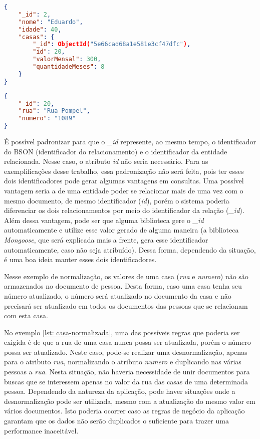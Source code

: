 \begin{lstlisting}[language=json, caption={Estrutura de Dados Normalizados da pessoa \textit{Eduardo}\label{lst: eduardo-normalizado}}]
{
    "_id": 2,
    "nome": "Eduardo",
    "idade": 40,
    "casas": {
        "_id": ObjectId("5e66cad68a1e581e3cf47dfc"),
        "id": 20,
        "valorMensal": 300,
        "quantidadeMeses": 8
    }
}
\end{lstlisting}

\begin{lstlisting}[language=json, caption={Estrutura de Dados Normalizados de uma casa\label{lst: casa-normalizada}}]
{
    "_id": 20,
    "rua": "Rua Pompel",
    "numero": "1089"
}
\end{lstlisting}

É possível padronizar para que o \textit{\_id} represente, ao mesmo tempo, o identificador do BSON (identificador do relacionamento) e o identificador da entidade relacionada. Nesse caso, o atributo \textit{id} não seria necessário. Para as exemplificações desse trabalho, essa padronização não será feita, pois ter esses dois identificadores pode gerar algumas vantagens em consultas. Uma possível vantagem seria a de uma entidade poder se relacionar mais de uma vez com o mesmo documento, de mesmo identificador (\textit{id}), porém o sistema poderia diferenciar os dois relacionamentos por meio do identificador da relação (\textit{\_id}). Além dessa vantagem, pode ser que alguma biblioteca gere o \textit{\_id} automaticamente e utilize esse valor gerado de alguma maneira (a biblioteca \textit{Mongoose}, que será explicada mais a frente, gera esse identificador automaticamente, caso não seja atribuído). Dessa forma, dependendo da situação, é uma boa ideia manter esses dois identificadores.
    
Nesse exemplo de normalização, os valores de uma casa (\textit{rua} e \textit{numero}) não são armazenados no documento de pessoa. Desta forma, caso uma casa tenha seu número atualizado, o número será atualizado no documento da casa e não precisará ser atualizado em todos os documentos das pessoas que se relacionam com esta casa.
    
No exemplo \ref{lst: casa-normalizada}, uma das possíveis regras que poderia ser exigida é de que a rua de uma casa nunca possa ser atualizada, porém o número possa ser atualizado. Neste caso, pode-se realizar uma desnormalização, apenas para o atributo \textit{rua}, normalizando o atributo \textit{numero} e duplicando nas várias pessoas a \textit{rua}. Nesta situação, não haveria necessidade de unir documentos para buscas que se interessem apenas no valor da rua das casas de uma determinada pessoa. Dependendo da natureza da aplicação, pode haver situações onde a desnormalização pode ser utilizada, mesmo com a atualização do mesmo valor em vários documentos. Isto poderia ocorrer caso as regras de negócio da aplicação garantam que os dados não serão duplicados o suficiente para trazer uma performance inaceitável.

